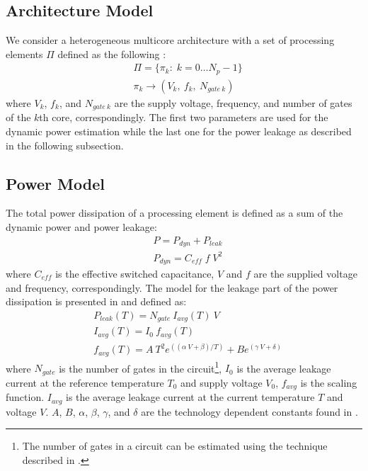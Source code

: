 \subsection{Architecture Model}
We consider a heterogeneous multicore architecture with a set of processing elements $\Pi$ defined as the following \cite{liao2005}:
\begin{align*}
  & \Pi = \{ \pi_k: \; k = 0 \dots N_p - 1 \} \\
  & \pi_k \rightarrow (V_k, \: f_k, \: N_{gate \: k})
\end{align*}
where $V_k$, $f_k$, and $N_{gate \: k}$ are the supply voltage, frequency, and number of gates of the $k$th core, correspondingly. The first two parameters are used for the dynamic power estimation while the last one for the power leakage as described in the following subsection.

\subsection{Power Model}
The total power dissipation of a processing element is defined as a sum of the dynamic power and power leakage:
\begin{align*}
  & P = P_{dyn} + P_{leak} \\
  & P_{dyn} = C_{eff} \; f \; V^2
\end{align*}
where $C_{eff}$ is the effective switched capacitance, $V$ and $f$ are the supplied voltage and frequency, correspondingly. The model for the leakage part of the power dissipation is presented in \cite{liao2005} and defined as:
\begin{align*}
  & P_{leak}(T) = N_{gate} \: I_{avg}(T) \: V \\
  & I_{avg}(T) = I_0 \: f_{avg}(T) \\
  & f_{avg}(T) = A \: T^2 e^{((\alpha \: V + \beta)/T)} + B e^{(\gamma \: V + \delta)}
\end{align*}
where $N_{gate}$ is the number of gates in the circuit\footnote{The number of gates in a circuit can be estimated using the technique described in \cite{li2004}.}, $I_0$ is the average leakage current at the reference temperature $T_0$ and supply voltage $V_0$, $f_{avg}$ is the scaling function. $I_{avg}$ is the average leakage current at the current temperature $T$ and voltage $V$. $A$, $B$, $\alpha$, $\beta$, $\gamma$, and $\delta$ are the technology dependent constants found in \cite{liao2005}.

